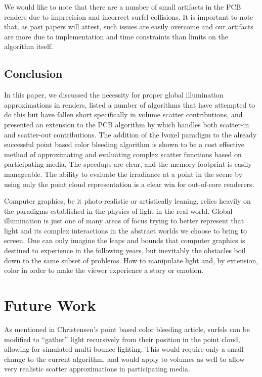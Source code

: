 \documentclass[12pt]{ucthesis}
\begin{document}
We would like to note that there are a number of small artifacts in the PCB renders due to imprecision and incorrect surfel collisions.  It is important to note that, as past papers will attest, such issues are easily overcome and our artifacts are more due to implementation and time constraints than limits on the algorithm itself.

\section{Conclusion}

In this paper, we discussed the necessity for proper global illumination approximations in renders, listed a number of algorithms that have attempted to do this but have fallen short specifically in volume scatter contributions, and presented an extension to the PCB algorithm by \cite{christensen:2008} which handles both scatter-in and scatter-out contributions.  The addition of the lvoxel paradigm to the already successful point based color bleeding algorithm is shown to be a cost effective method of approximating and evaluating complex scatter functions based on participating media.  The speedups are clear, and the memory footprint is easily manageable.  The ability to evaluate the irradiance at a point in the scene by using only the point cloud representation is a clear win for out-of-core renderers.

Computer graphics, be it photo-realistic or artistically leaning, relies heavily on the paradigms established in the physics of light in the real world.  Global illumination is just one of many areas of focus trying to better represent that light and its complex interactions in the abstract worlds we choose to bring to screen.  One can only imagine the leaps and bounds that computer graphics is destined to experience in the following years, but inevitably the obstacles boil down to the same subset of problems.  How to manipulate light and, by extension, color in order to make the viewer experience a story or emotion.

\chapter{Future Work}


As mentioned in Christensen's point based color bleeding article, surfels can be modified to ``gather'' light recursively from their position in the point cloud, allowing for simulated multi-bounce lighting.  This would require only a small change to the current algorithm, and would apply to volumes as well to allow very realistic scatter approximations in participating media.
\end{document}
